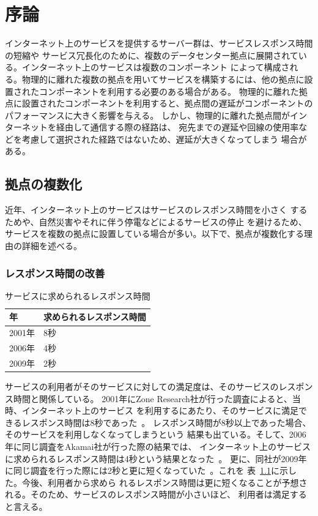 \chapter{序論}
\label{background}

インターネット上のサービスを提供するサーバー群は、サービスレスポンス時間の短縮や
サービス冗長化のために、複数のデータセンター拠点に展開されている。インターネット上のサービスは複数のコンポーネント
によって構成される。物理的に離れた複数の拠点を用いてサービスを構築するには、他の拠点に設置されたコンポーネントを利用する必要のある場合がある。
物理的に離れた拠点に設置されたコンポーネントを利用すると、拠点間の遅延がコンポーネントのパフォーマンスに大きく影響を与える。
しかし、物理的に離れた拠点間がインターネットを経由して通信する際の経路は、
宛先までの遅延や回線の使用率などを考慮して選択された経路ではないため、遅延が大きくなってしまう
場合がある。

\section{拠点の複数化}
\label{background:multilocation}

近年、インターネット上のサービスはサービスのレスポンス時間を小さく
するためや、自然災害やそれに伴う停電などによるサービスの停止
を避けるため、サービスを複数の拠点に設置している場合が多い。以下で、拠点が複数化する理由の詳細を述べる。

\subsection{レスポンス時間の改善}
\label{background:ml1}

\begin{table}[tb]
	\begin{center}
		\caption{サービスに求められるレスポンス時間}
		\begin{tabular}{|l|l|}
			\hline
				年 & 求められるレスポンス時間 \\
			\hline
				2001年 & 8秒 \\
				2006年 & 4秒 \\
				2009年 & 2秒 \\
			\hline
		\end{tabular}
		\label{table:responsetime}
	\end{center}
\end{table}

サービスの利用者がそのサービスに対しての満足度は、そのサービスのレスポンス時間と関係している。
2001年にZone Research社が行った調査によると、当時、インターネット上のサービス
を利用するにあたり、そのサービスに満足できるレスポンス時間は8秒であった~\cite{zonaresearch}。
レスポンス時間が8秒以上であった場合、そのサービスを利用しなくなってしまうという
結果も出ている。そして、2006年に同じ調査をAkamai社が行った際の結果では、
インターネット上のサービスに求められるレスポンス時間は4秒という結果となった~\cite{akamai4sec}。
更に、同社が2009年に同じ調査を行った際には2秒と更に短くなっていた~\cite{acm:sigops}。これを
表~\ref{table:responsetime}に示した。今後、利用者から求めら
れるレスポンス時間は更に短くなることが予想される。そのため、サービスのレスポンス時間が小さいほど、
利用者は満足すると言える。

